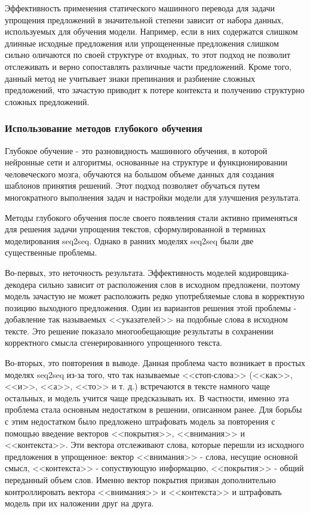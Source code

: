 Эффективность применения статического машинного перевода для задачи упрощения предложений в значительной степени зависит от набора данных, используемых для обучения модели. Например, если в них содержатся слишком длинные исходные предложения или упрощененные предложения слишком сильно оличаются по своей структуре от входных, то этот подход не позволит отслеживать и верно сопоставлять различные части предложений. Кроме того, данный метод не учитывает знаки препинания и разбиение сложных предложений, что зачастую приводит к потере контекста и получению структурно сложных предложений.


\subsubsection{Использование методов глубокого обучения}

Глубокое обучение - это разновидность машинного обучения, в которой нейронные сети и алгоритмы, основанные на структуре и функционировании человеческого мозга, обучаются на большом объеме данных для создания шаблонов принятия решений. Этот подход позволяет обучаться путем многократного выполнения задач и настройки модели для улучшения результата\cite{deep}.

Методы глубокого обучения после своего появления стали активно применяться для решения задачи упрощения текстов, сформулированной в терминах моделирования seq2seq. Однако в ранних моделях seq2seq были две существенные проблемы.

Во-первых, это неточность результата. Эффективность моделей кодировщика-декодера сильно зависит от расположения слов в исходном предложени, поэтому модель зачастую не может расположить редко употребляемые слова в корректную позицию выходного предложения. Один из вариантов решения этой проблемы -   добавление так называемых <<указателей>> на подобные слова в исходном тексте\cite{nisioi_exploring_2017}. Это решение показало многообещающие результаты в сохранении корректного смысла сгенерированного упрощенного текста.

Во-вторых, это повторения в выводе. Данная проблема часто возникает в простых моделях seq2seq из-за того, что так называемые <<стоп-слова>> (<<как>>, <<и>>, <<а>>, <<то>> и т. д.) встречаются в тексте намного чаще остальных, и модель учится чаще предсказывать их. В частности, именно эта проблема стала основным недостатком в решении, описанном ранее\cite{nisioi_exploring_2017}. Для борьбы с этим недостатком было предложено штрафовать модель за повторения с помощью введение векторов <<покрытия>>, <<внимания>> и <<контекста>>. Эти вектора отслеживают слова, которые перешли из исходного предложения в упрощенное: вектор <<внимания>> - слова, несущие основной смысл, <<контекста>> - сопуствующую информацию, <<покрытия>> - общий переданный объем слов. Именно вектор покрытия призван дополнительно контроллировать вектора  <<внимания>> и <<контекста>> и штрафовать модель при их наложении друг на друга\cite{see_get_2017}.

